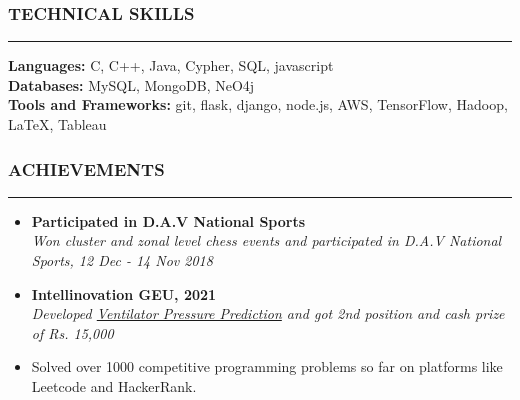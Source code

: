 \documentclass[a4paper]{article}
\begin{document}
\subsubsection*{TECHNICAL SKILLS}
\hrule
\vspace{10pt}
\textbf{Languages: } C, C++, Java, Cypher, SQL, javascript \\
\textbf{Databases: } MySQL, MongoDB, NeO4j \\
\textbf{Tools and Frameworks: } git, flask, django, node.js, AWS, TensorFlow, Hadoop, \LaTeX, Tableau

\subsubsection*{ACHIEVEMENTS}
\hrule
\vspace{10pt}

\begin{itemize}[leftmargin=*, nosep]
    \item \noindent \textbf{Participated in D.A.V National Sports} \\
          \textit{Won cluster and zonal level chess events and participated in D.A.V National Sports, 12 Dec - 14 Nov 2018}
    \item \noindent \textbf{Intellinovation GEU, 2021} \\
          \textit{Developed \href{https://www.github.com/Bot-7037/Ventilator-Pressure-Prediction}{Ventilator Pressure Prediction} and got 2nd position and cash prize of Rs. 15,000 }
    \item Solved over 1000 competitive programming problems so far on platforms like Leetcode and HackerRank.
\end{itemize}
\end{document}
